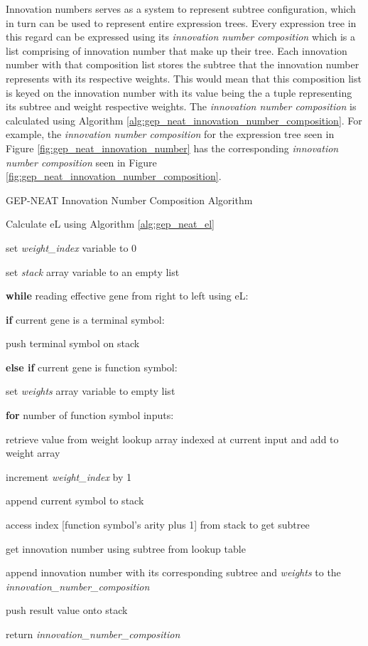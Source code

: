 \noindent Innovation numbers serves as a system to represent subtree configuration, which in turn can be used to represent entire expression trees. Every expression tree in this regard can be expressed using its \textit{innovation number composition} which is a list comprising of innovation number that make up their tree. Each innovation number with that composition list stores the subtree that the innovation number represents with its respective weights. This would mean that this composition list is keyed on the innovation number with its value being the a tuple representing its subtree and weight respective weights. The \textit{innovation number composition} is calculated using Algorithm \ref{alg:gep_neat_innovation_number_composition}. For example, the \textit{innovation number composition} for the expression tree seen in Figure \ref{fig:gep_neat_innovation_number} has the corresponding \textit{innovation number composition} seen in Figure \ref{fig:gep_neat_innovation_number_composition}.

\begin{algorithm}
	\caption{GEP-NEAT Innovation Number Composition Algorithm}\label{alg:gep_neat_innovation_number_composition}
	\begin{algorithmic}[1]
	\item Calculate eL using Algorithm \ref{alg:gep_neat_el}
	\item set \textit{weight\_index} variable to 0
	\item set \textit{stack} array variable to an empty list
	\item \textbf{while} reading effective gene from right to left using eL:
	\item \quad \textbf{if} current gene is a terminal symbol:
	\item \quad \quad push terminal symbol on stack
	\item \quad \textbf{else if} current gene is function symbol:
	\item \quad \quad set \textit{weights} array variable to empty list
	\item \quad \quad \textbf{for} number of function symbol inputs:
	\item \quad \quad \quad retrieve value from weight lookup array indexed at current input and add to weight array
	\item \quad \quad \quad increment \textit{weight\_index} by 1
	\item \quad \quad append  current symbol to stack
	\item \quad \quad access index [function symbol's arity plus 1] from stack to get subtree
	\item \quad \quad get innovation number using subtree from lookup table
	\item \quad \quad append innovation number with its corresponding subtree and \textit{weights} to the \textit{innovation\_number\_composition}
	\item \quad \quad push result value onto stack
	\item return \textit{innovation\_number\_composition}
\end{algorithmic}
\end{algorithm}

